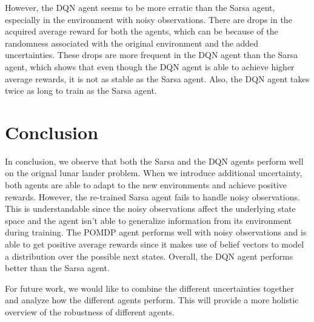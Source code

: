 \documentclass[10pt, conference]{IEEEtran}
\begin{document}
However, the DQN agent seems to be more erratic than the Sarsa agent, especially in the environment with noisy observations. There are drops in the acquired average reward for both the agents, which can be because of the randomness associated with the original environment and the added uncertainties. These drops are more frequent in the DQN agent than the Sarsa agent, which shows that even though the DQN agent is able to achieve higher average rewards, it is not as stable as the Sarsa agent. Also, the DQN agent takes twice as long to train as the Sarsa agent. 
 

\section*{Conclusion}
In conclusion, we observe that both the Sarsa and the DQN agents perform well on the orignal lunar lander problem. When we introduce additional uncertainty, both agents are able to adapt to the new environments and achieve positive rewards. However, the re-trained Sarsa agent fails to handle noisy observations. This is understandable since the noisy observations affect the underlying state space and the agent isn't able to generalize information from its environment during training. The POMDP agent performs well with noisy observations and is able to get positive average rewards since it makes use of belief vectors to model a distribution over the possible next states. Overall, the DQN agent performs better than the Sarsa agent.

For future work, we would like to combine the different uncertainties together and analyze how the different agents perform. This will provide a more holistic overview of the robustness of different agents.



\end{document}
